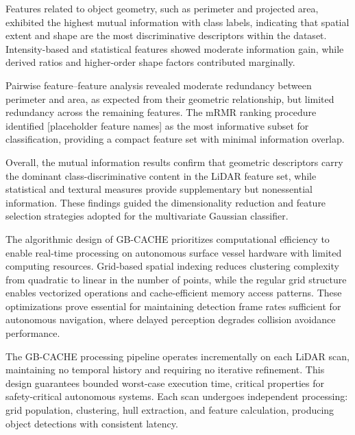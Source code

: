 \documentclass{erauthesis}
\begin{document}
Features related to object geometry, such as perimeter and projected area, exhibited the highest mutual information with class labels, indicating that spatial extent and shape are the most discriminative descriptors within the dataset. 
Intensity-based and statistical features showed moderate information gain, while derived ratios and higher-order shape factors contributed marginally.

Pairwise feature–feature analysis revealed moderate redundancy between perimeter and area, as expected from their geometric relationship, but limited redundancy across the remaining features. 
The mRMR ranking procedure identified [placeholder feature names] as the most informative subset for classification, providing a compact feature set with minimal information overlap.

Overall, the mutual information results confirm that geometric descriptors carry the dominant class-discriminative content in the LiDAR feature set, while statistical and textural measures provide supplementary but nonessential information. 
These findings guided the dimensionality reduction and feature selection strategies adopted for the multivariate Gaussian classifier.




The algorithmic design of \ac{GB-CACHE} prioritizes computational efficiency to enable real-time processing on autonomous surface vessel hardware with limited computing resources.
Grid-based spatial indexing reduces clustering complexity from quadratic to linear in the number of points, while the regular grid structure enables vectorized operations and cache-efficient memory access patterns.
These optimizations prove essential for maintaining detection frame rates sufficient for autonomous navigation, where delayed perception degrades collision avoidance performance.

The GB-CACHE processing pipeline operates incrementally on each \ac{LiDAR} scan, maintaining no temporal history and requiring no iterative refinement.
This design guarantees bounded worst-case execution time, critical properties for safety-critical autonomous systems.
Each scan undergoes independent processing: grid population, clustering, hull extraction, and feature calculation, producing object detections with consistent latency.
\end{document}
